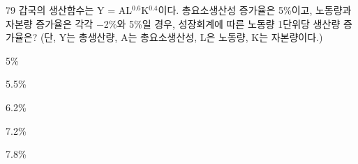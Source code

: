 \begin{question}{79}
갑국의 생산함수는 Y = AL$^{0.6}$K$^{0.4}$이다. 총요소생산성 증가율은 5\%이고, 노동량과 자본량 증가율은 각각 $-$2\%와 5\%일 경우, 성장회계에 따른 노동량 1단위당 생산량 증가율은? (단, Y는 총생산량, A는 총요소생산성, L은 노동량, K는 자본량이다.)
\begin{choices}
  \item 5\%
  \item 5.5\%
  \item 6.2\%
  \item 7.2\%
  \item 7.8\%
\end{choices}
\end{question}
